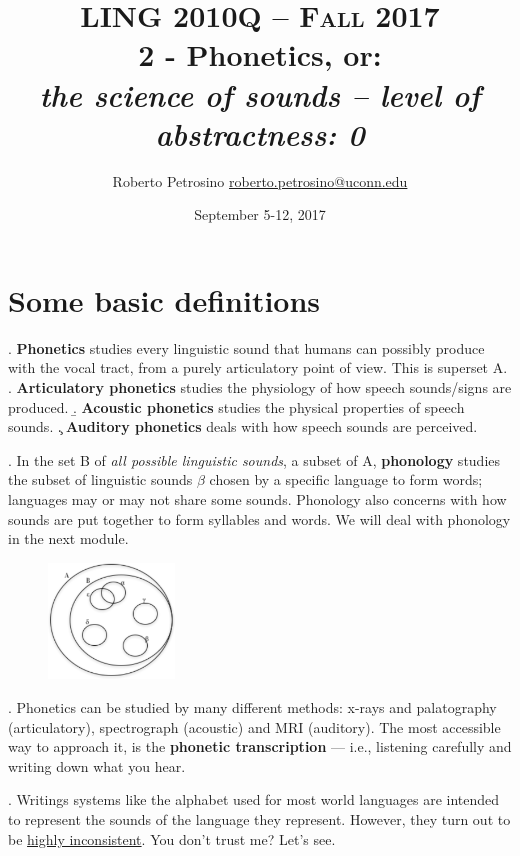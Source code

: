 \documentclass[11pt, oneside]{article}   	%
\title{{\normalsize LING 2010Q -- {\scshape Fall 2017}} \\ {\bfseries 2 - Phonetics}, or: \\ {\itshape the science of sounds -- level of abstractness: 0}}
\author{Roberto Petrosino \hspace{0.2cm} \url{roberto.petrosino@uconn.edu}}
\date{September 5-12, 2017}
\begin{document}
\maketitle
\tableofcontents

\newpage

\section{Some basic definitions}

\ex. {\bfseries Phonetics} studies every linguistic sound that humans can possibly produce with the vocal tract, from a purely articulatory point of view. This is superset A. 
\a. {\bfseries Articulatory phonetics} studies the physiology of how speech sounds/signs are produced. 
\b. {\bfseries Acoustic phonetics} studies the physical properties of speech sounds. 
\c. {\bfseries Auditory phonetics} deals with how speech sounds are perceived.

\ex. In the set B of {\itshape all possible linguistic sounds}, a subset of A, {\bfseries phonology} studies the subset of linguistic sounds $\beta$ chosen by a specific language to form words; languages may or may not share some sounds. Phonology also concerns with how sounds are put together to form syllables and words. We will deal with phonology in the next module. 

\begin{figure}[h!]
\centering
\includegraphics[width=0.3\textwidth]{sounds_sets}
\end{figure}%

\ex. Phonetics can be studied by many different methods: x-rays and palatography (articulatory), spectrograph (acoustic) and MRI (auditory).  The most accessible way to approach it, is the {\bfseries phonetic transcription} --- i.e., listening carefully and writing down what you hear.

\ex. Writings systems like the alphabet used for most world languages are intended to represent the sounds of the language they represent. However, they turn out to be \underline{highly inconsistent}. You don't trust me? Let's see.
\end{document}
